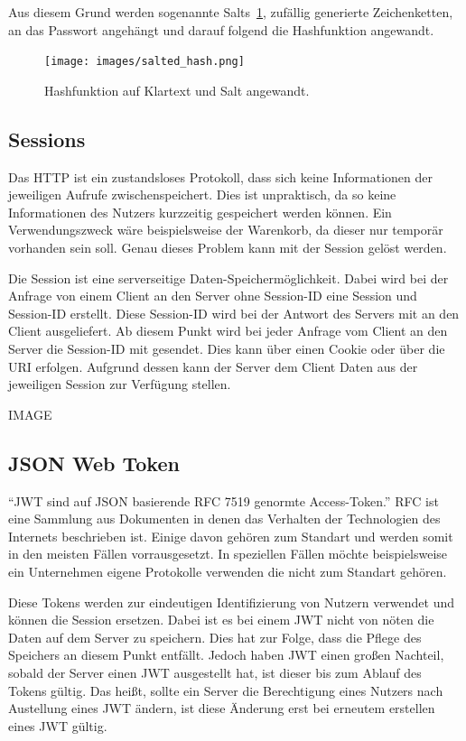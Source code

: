 \documentclass[11pt]{article}
\begin{document}
	Aus diesem Grund werden sogenannte Salts~\ref{fig:salted-hash}, zufällig generierte Zeichenketten, an das Passwort angehängt und darauf folgend die Hashfunktion angewandt.

	\begin{figure}[h]
		\texttt{[image: images/salted\_hash.png]}
		\caption{Hashfunktion auf Klartext und Salt angewandt.}
		\label{fig:salted-hash}
	\end{figure}
		
	\subsection{Sessions}
	\label{sec: sessions}
	
	Das \gls{HTTP} ist ein zustandsloses Protokoll, dass sich keine Informationen der jeweiligen Aufrufe zwischenspeichert. Dies ist unpraktisch, da so keine Informationen des Nutzers kurzzeitig gespeichert werden können. Ein Verwendungszweck wäre beispielsweise der Warenkorb, da dieser nur temporär vorhanden sein soll. Genau dieses Problem kann mit der Session gelöst werden.
	
	Die Session ist eine serverseitige Daten-Speichermöglichkeit. Dabei wird bei der Anfrage von einem Client an den Server ohne Session-ID eine Session und Session-ID erstellt. Diese Session-ID wird bei der Antwort des Servers mit an den Client ausgeliefert. Ab diesem Punkt wird bei jeder Anfrage vom Client an den Server die Session-ID mit gesendet. Dies kann über einen Cookie oder über die \gls{URI} erfolgen. Aufgrund dessen kann der Server dem Client Daten aus der jeweiligen Session zur Verfügung stellen.
	
	IMAGE
	
	\newpage
	
	\subsection{JSON Web Token}
	\label{sec: jwt}
	\enquote{\gls{JWT} sind auf \gls{JSON} basierende \gls{RFC} 7519 genormte Access-Token.} \gls{RFC} ist eine Sammlung aus Dokumenten in denen das Verhalten der Technologien des Internets beschrieben ist. Einige davon gehören zum Standart und werden somit in den meisten Fällen vorrausgesetzt. In speziellen Fällen möchte beispielsweise ein Unternehmen eigene Protokolle verwenden die nicht zum Standart gehören. 
	
	Diese Tokens werden zur eindeutigen Identifizierung von Nutzern verwendet und können die Session ersetzen. Dabei ist es bei einem \gls{JWT} nicht von nöten die Daten auf dem Server zu speichern. Dies hat zur Folge, dass die Pflege des Speichers an diesem Punkt entfällt. Jedoch haben \gls{JWT} einen großen Nachteil, sobald der Server einen \gls{JWT} ausgestellt hat, ist dieser bis zum Ablauf des Tokens gültig. Das heißt, sollte ein Server die Berechtigung eines Nutzers nach Austellung eines \gls{JWT} ändern, ist diese Änderung erst bei erneutem erstellen eines \gls{JWT} gültig.
	
\end{document}

